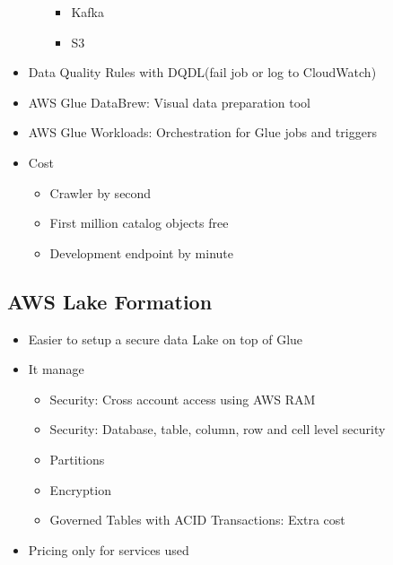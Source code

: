 \documentclass[../../main.tex]{subfiles}
\begin{document}
\begin{itemize}
\begin{itemize}
\begin{itemize}
            \item Kafka
            \item S3
        \end{itemize}
    \end{itemize}
    \item Data Quality Rules with DQDL(fail job or log to CloudWatch)
    \item AWS Glue DataBrew: Visual data preparation tool
    \item AWS Glue Workloads: Orchestration for Glue jobs and triggers
    \item Cost
    \begin{itemize}
        \item Crawler by second
        \item First million catalog objects free
        \item Development endpoint by minute
    \end{itemize}
\end{itemize}

\subsection{AWS Lake Formation}
\begin{itemize}
    \item Easier to setup a secure data Lake on top of Glue
    \item It manage
    \begin{itemize}
        \item Security: Cross account access using AWS RAM
        \item Security: Database, table, column, row and cell level security
        \item Partitions
        \item Encryption
        \item Governed Tables with ACID Transactions: Extra cost
    \end{itemize}
    \item Pricing only for services used
\end{itemize}
\end{document}
